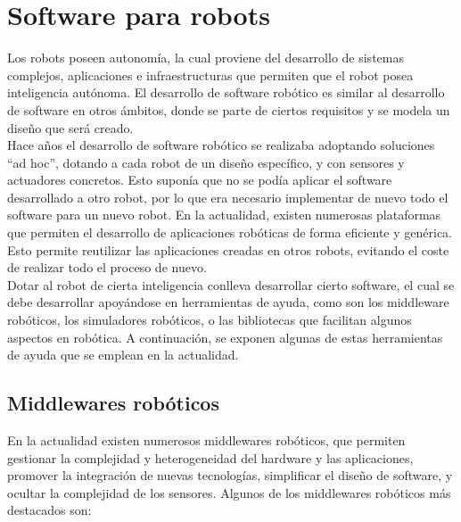 \section{Software para robots}
Los robots poseen autonomía, la cual proviene del desarrollo de sistemas complejos, aplicaciones e infraestructuras que permiten que el robot posea inteligencia autónoma. El desarrollo de software robótico es similar al desarrollo de software en otros ámbitos, donde se parte de ciertos requisitos y se modela un diseño que será creado.\\

Hace años el desarrollo de software robótico se realizaba adoptando soluciones ``ad hoc'', dotando a cada robot de un diseño específico, y con sensores y actuadores concretos. Esto suponía que no se podía aplicar el software desarrollado a otro robot, por lo que era necesario implementar de nuevo todo el software para un nuevo robot. En la actualidad, existen numerosas plataformas que permiten el desarrollo de aplicaciones robóticas de forma eficiente y genérica. Esto permite reutilizar las aplicaciones creadas en otros robots, evitando el coste de realizar todo el proceso de nuevo.\\

Dotar al robot de cierta inteligencia conlleva desarrollar cierto software, el cual se debe desarrollar apoyándose en herramientas de ayuda, como son los middleware robóticos, los simuladores robóticos, o las  bibliotecas que facilitan algunos aspectos en robótica. A continuación, se exponen algunas de estas herramientas de ayuda que se emplean en la actualidad.

\subsection{Middlewares robóticos}
En la actualidad existen numerosos middlewares robóticos, que permiten gestionar la complejidad y heterogeneidad del hardware y las aplicaciones, promover la integración de nuevas tecnologías, simplificar el diseño de software, y ocultar la complejidad de los sensores. Algunos de los middlewares robóticos más destacados son:

